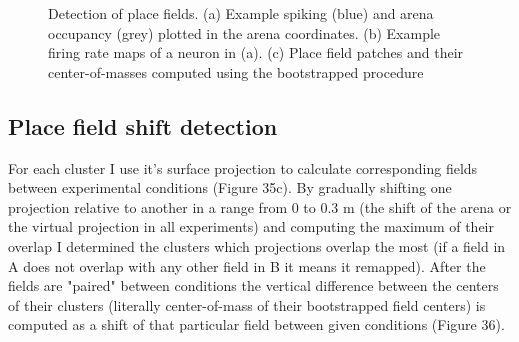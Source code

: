 \begin{figure}
\captionsetup{format=plain}
\caption[Place field detection]{
Detection of place fields. (a) Example spiking (blue) and arena occupancy (grey) plotted in the arena coordinates. (b) Example firing rate maps of a neuron in (a). (c) Place field patches and their center-of-masses computed using the bootstrapped procedure
}
\label{fig:F35_place_fields}
\end{figure}


\subsection{Place field shift detection}

For each cluster I use it's surface projection to calculate corresponding fields between experimental conditions (Figure 35c). By gradually shifting one projection relative to another in a range from 0 to 0.3 m (the shift of the arena or the virtual projection in all experiments) and computing the maximum of their overlap I determined the clusters which projections overlap the most (if a field in A does not overlap with any other field in B it means it remapped). After the fields are "paired" between conditions the vertical difference between the centers of their clusters (literally center-of-mass of their bootstrapped field centers) is computed as a shift of that particular field between given conditions (Figure 36).

